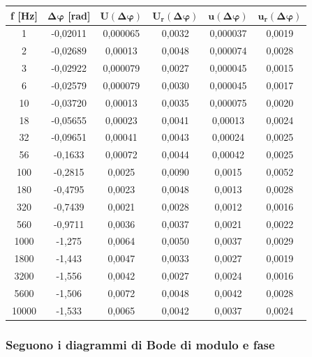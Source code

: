 \begin{table}[!ht]
    \centering
    \begin{tabular}{|c|c|c|c|c|c|}
    \hline

        \textbf{f [Hz]} & $\bm{\Delta\varphi}$ \textbf{[rad]} & $\bm{U(\Delta\varphi)}$ & $\bm{U_r(\Delta\varphi)}$ & $\bm{u(\Delta\varphi)}$ & $\bm{u_r(\Delta\varphi)}$ \\ \hline

        1 & -0,02011 & 0,000065 & 0,0032 & 0,000037 & 0,0019 \\ \hline
        2 & -0,02689 & 0,00013 & 0,0048 & 0,000074 & 0,0028 \\ \hline
        3 & -0,02922 & 0,000079 & 0,0027 & 0,000045 & 0,0015 \\ \hline
        6 & -0,02579 & 0,000079 & 0,0030 & 0,000045 & 0,0017 \\ \hline
        10 & -0,03720 & 0,00013 & 0,0035 & 0,000075 & 0,0020 \\ \hline
        18 & -0,05655 & 0,00023 & 0,0041 & 0,00013 & 0,0024 \\ \hline
        32 & -0,09651 & 0,00041 & 0,0043 & 0,00024 & 0,0025 \\ \hline
        56 & -0,1633 & 0,00072 & 0,0044 & 0,00042 & 0,0025 \\ \hline
        100 & -0,2815 & 0,0025 & 0,0090 & 0,0015 & 0,0052 \\ \hline
        180 & -0,4795 & 0,0023 & 0,0048 & 0,0013 & 0,0028 \\ \hline
        320 & -0,7439 & 0,0021 & 0,0028 & 0,0012 & 0,0016 \\ \hline
        560 & -0,9711 & 0,0036 & 0,0037 & 0,0021 & 0,0022 \\ \hline
        1000 & -1,275 & 0,0064 & 0,0050 & 0,0037 & 0,0029 \\ \hline
        1800 & -1,443 & 0,0047 & 0,0033 & 0,0027 & 0,0019 \\ \hline
        3200 & -1,556 & 0,0042 & 0,0027 & 0,0024 & 0,0016 \\ \hline
        5600 & -1,506 & 0,0072 & 0,0048 & 0,0042 & 0,0028 \\ \hline
        10000 & -1,533 & 0,0065 & 0,0042 & 0,0037 & 0,0024 \\ \hline
    \end{tabular}
\end{table}

\subsubsection*{Seguono i diagrammi di Bode di modulo e fase }


